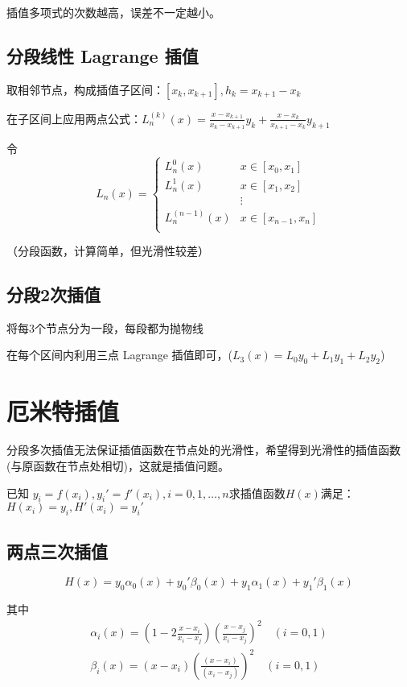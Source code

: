 \documentclass[UTF8,a4paper,11pt,oneside]{ctexbook}
\begin{document}
插值多项式的次数越高，误差不一定越小。

\subsection{分段线性 Lagrange 插值}

取相邻节点，构成插值子区间：\([x_k,x_{k+1}],h_k=x_{k+1}-x_k\)

在子区间上应用两点公式：\(L_n^{(k)}(x)=\frac{x-x_{k+1}}{x_k-x_{k+1}}y_k+\frac{x-x_k}{x_{k+1}-x_k}y_{k+1}\)

令
\[
L_n(x)=
\begin{cases}
    L_n^0(x)&x\in[x_0,x_1]\\
    L_n^1(x)&x\in[x_1,x_2]\\
    &\vdots\\
    L_n^{(n-1)}(x)&x\in[x_{n-1},x_n]\\
\end{cases}
\]

（分段函数，计算简单，但光滑性较差）

\subsection{分段2次插值}

将每3个节点分为一段，每段都为抛物线

在每个区间内利用三点 Lagrange 插值即可，(\(L_3(x)=L_0y_0+L_1y_1+L_2y_2\))

\section{厄米特插值}

分段多次插值无法保证插值函数在节点处的光滑性，希望得到光滑性的插值函数(与原函数在节点处相切)，这就是插值问题。

已知
\(y_i=f(x_i),y_i'=f'(x_i),i=0,1,\ldots,n\)求插值函数\(H(x)\)满足：\(H(x_i)=y_i,H'(x_i)=y_i'\)

\subsection{两点三次插值}
\[
H(x)=y_0\alpha_0(x)+y_0'\beta_0(x)+y_1\alpha_1(x)+y_1'\beta_1(x)
\]

其中
\begin{gather*}
    \alpha_i(x)=\left(1-2\frac{x-x_i}{x_i-x_j}\right)\left(\frac{x-x_j}{x_i-x_j}\right)^2\quad(i=0,1)\\
    \beta_i(x)=(x-x_i)\left(\frac{(x-x_i)}{(x_i-x_j)}\right)^2\quad(i=0,1)
\end{gather*}
\end{document}
